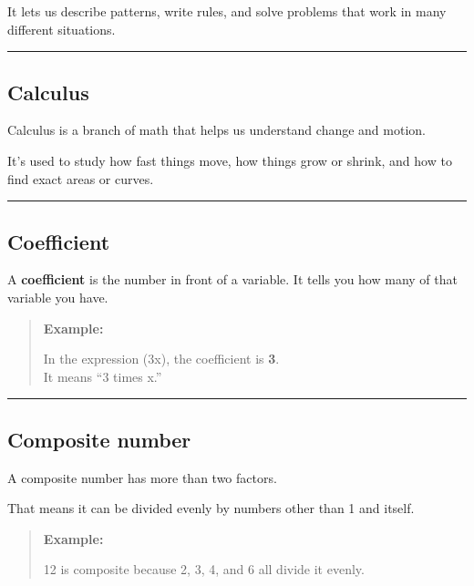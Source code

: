 \documentclass[
  letterpaper,
  DIV=11,
  numbers=noendperiod]{scrreprt}
\begin{document}
It lets us describe patterns, write rules, and solve problems that work
in many different situations.

\begin{center}\rule{0.5\linewidth}{0.5pt}\end{center}

\subsection*{Calculus}\label{glossary-calculus}

Calculus is a branch of math that helps us understand change and motion.

It's used to study how fast things move, how things grow or shrink, and
how to find exact areas or curves.

\begin{center}\rule{0.5\linewidth}{0.5pt}\end{center}

\subsection*{Coefficient}\label{glossary-coefficient}

A \textbf{coefficient} is the number in front of a variable. It tells
you how many of that variable you have.

\begin{quote}
\textbf{Example:}

In the expression (3x), the coefficient is \textbf{3}.\\
It means ``3 times x.''
\end{quote}

\begin{center}\rule{0.5\linewidth}{0.5pt}\end{center}

\subsection*{Composite number}\label{glossary-composite-number}

A composite number has more than two factors.

That means it can be divided evenly by numbers other than 1 and itself.

\begin{quote}
\textbf{Example:}

12 is composite because 2, 3, 4, and 6 all divide it evenly.
\end{quote}
\end{document}
